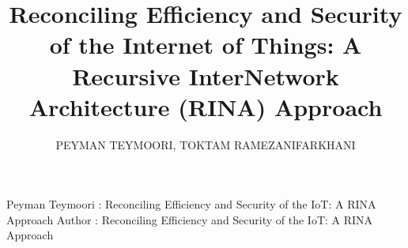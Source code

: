 \documentclass{ieeeaccess}
\begin{document}

\title{Reconciling Efficiency and Security of the Internet of Things: A Recursive InterNetwork Architecture (RINA) Approach}
\author{\uppercase{Peyman Teymoori},
\uppercase{Toktam Ramezanifarkhani}}

\address[1]{School of Business, University of South-Eastern Norway (e-mail: peyman.teymoori@usn.no)}
\address[2]{School of Economics, Innovation and Technology, Kristiania University College, Norway (e-mail: toktam.ramezanifarkhani@kristiania.no)}
\address[3]{Department of Informatics, University of Oslo, Norway (e-mail: \{peymant | toktamr\}@ifi.uio.no)}

\markboth
{Peyman Teymoori \headeretal: Reconciling Efficiency and Security of the IoT: A RINA Approach}
{Author \headeretal: Reconciling Efficiency and Security of the IoT: A RINA Approach}

\end{document}
